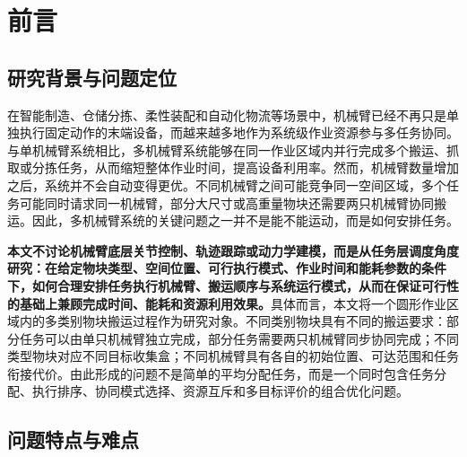 \section{前言}

\subsection{研究背景与问题定位}

在智能制造、仓储分拣、柔性装配和自动化物流等场景中，机械臂已经不再只是单独执行固定动作的末端设备，而越来越多地作为系统级作业资源参与多任务协同。与单机械臂系统相比，多机械臂系统能够在同一作业区域内并行完成多个搬运、抓取或分拣任务，从而缩短整体作业时间，提高设备利用率。然而，机械臂数量增加之后，系统并不会自动变得更优。不同机械臂之间可能竞争同一空间区域，多个任务可能同时请求同一机械臂，部分大尺寸或高重量物块还需要两只机械臂协同搬运。因此，多机械臂系统的关键问题之一并不是能不能运动，而是如何安排任务。

\textbf{本文不讨论机械臂底层关节控制、轨迹跟踪或动力学建模，而是从任务层调度角度研究：在给定物块类型、空间位置、可行执行模式、作业时间和能耗参数的条件下，如何合理安排任务执行机械臂、搬运顺序与系统运行模式，从而在保证可行性的基础上兼顾完成时间、能耗和资源利用效果。}具体而言，本文将一个圆形作业区域内的多类别物块搬运过程作为研究对象。不同类别物块具有不同的搬运要求：部分任务可以由单只机械臂独立完成，部分任务需要两只机械臂同步协同完成；不同类型物块对应不同目标收集盒；不同机械臂具有各自的初始位置、可达范围和任务衔接代价。由此形成的问题不是简单的平均分配任务，而是一个同时包含任务分配、执行排序、协同模式选择、资源互斥和多目标评价的组合优化问题。

\subsection{问题特点与难点}

